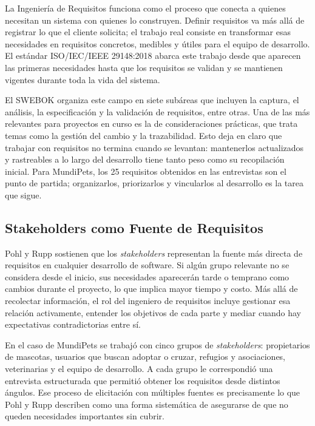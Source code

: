 \documentclass[journal,onecolumn]{IEEEtran}
\begin{document}
La Ingeniería de Requisitos funciona como el proceso que conecta a quienes necesitan un sistema
con quienes lo construyen. Definir requisitos va más allá de registrar lo que el cliente solicita;
el trabajo real consiste en transformar esas necesidades en requisitos concretos, medibles y útiles
para el equipo de desarrollo. El estándar ISO/IEC/IEEE 29148:2018 \cite{iso29148} abarca este
trabajo desde que aparecen las primeras necesidades hasta que los requisitos se validan y se
mantienen vigentes durante toda la vida del sistema.

El SWEBOK \cite{swebok2024} organiza este campo en siete subáreas que incluyen la captura, el
análisis, la especificación y la validación de requisitos, entre otras. Una de las más relevantes
para proyectos en curso es la de consideraciones prácticas, que trata temas como la gestión del
cambio y la trazabilidad. Esto deja en claro que trabajar con requisitos no termina cuando se
levantan: mantenerlos actualizados y rastreables a lo largo del desarrollo tiene tanto peso como
su recopilación inicial. Para MundiPets, los 25 requisitos obtenidos en las entrevistas son el
punto de partida; organizarlos, priorizarlos y vincularlos al desarrollo es la tarea que sigue.

\subsection{Stakeholders como Fuente de Requisitos}

Pohl y Rupp \cite{pohl2015} sostienen que los \textit{stakeholders} representan la fuente más
directa de requisitos en cualquier desarrollo de software. Si algún grupo relevante no se considera
desde el inicio, sus necesidades aparecerán tarde o temprano como cambios durante el proyecto, lo
que implica mayor tiempo y costo. Más allá de recolectar información, el rol del ingeniero de
requisitos incluye gestionar esa relación activamente, entender los objetivos de cada parte y
mediar cuando hay expectativas contradictorias entre sí.

En el caso de MundiPets se trabajó con cinco grupos de \textit{stakeholders}: propietarios de
mascotas, usuarios que buscan adoptar o cruzar, refugios y asociaciones, veterinarias y el equipo
de desarrollo. A cada grupo le correspondió una entrevista estructurada que permitió obtener los
requisitos desde distintos ángulos. Ese proceso de elicitación con múltiples fuentes es
precisamente lo que Pohl y Rupp \cite{pohl2015} describen como una forma sistemática de asegurarse
de que no queden necesidades importantes sin cubrir.
\end{document}
